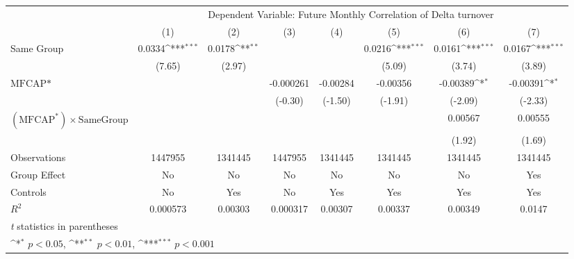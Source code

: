 {
\def\sym#1{\ifmmode^{#1}\else\(^{#1}\)\fi}
\begin{tabular}{l*{7}{c}}
\hline\hline
                &\multicolumn{7}{c}{Dependent Variable: Future Monthly Correlation of Delta turnover}                                                \\\cmidrule(lr){2-8}
                &\multicolumn{1}{c}{(1)}         &\multicolumn{1}{c}{(2)}         &\multicolumn{1}{c}{(3)}         &\multicolumn{1}{c}{(4)}         &\multicolumn{1}{c}{(5)}         &\multicolumn{1}{c}{(6)}         &\multicolumn{1}{c}{(7)}         \\
\hline
Same Group      &   0.0334\sym{***}&   0.0178\sym{**} &                  &                  &   0.0216\sym{***}&   0.0161\sym{***}&   0.0167\sym{***}\\
                &   (7.65)         &   (2.97)         &                  &                  &   (5.09)         &   (3.74)         &   (3.89)         \\
[1em]
$ \text{MFCAP*} $&                  &                  &-0.000261         & -0.00284         & -0.00356         & -0.00389\sym{*}  & -0.00391\sym{*}  \\
                &                  &                  &  (-0.30)         &  (-1.50)         &  (-1.91)         &  (-2.09)         &  (-2.33)         \\
[1em]
 $ (\text{MFCAP}^*) \times {\text{SameGroup} }  $ &                  &                  &                  &                  &                  &  0.00567         &  0.00555         \\
                &                  &                  &                  &                  &                  &   (1.92)         &   (1.69)         \\
\hline
Observations    &  1447955         &  1341445         &  1447955         &  1341445         &  1341445         &  1341445         &  1341445         \\
Group Effect    &       No         &       No         &       No         &       No         &       No         &       No         &      Yes         \\
Controls        &       No         &      Yes         &       No         &      Yes         &      Yes         &      Yes         &      Yes         \\
$ R^2 $         & 0.000573         &  0.00303         & 0.000317         &  0.00307         &  0.00337         &  0.00349         &   0.0147         \\
\hline\hline
\multicolumn{8}{l}{\footnotesize \textit{t} statistics in parentheses}\\
\multicolumn{8}{l}{\footnotesize \sym{*} \(p<0.05\), \sym{**} \(p<0.01\), \sym{***} \(p<0.001\)}\\
\end{tabular}
}
